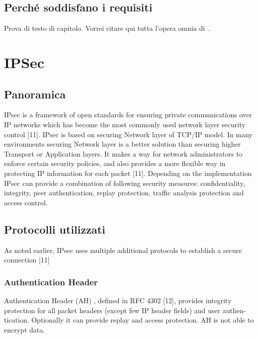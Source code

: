 \subsection{Perché soddisfano i requisiti}
Prova di testo di capitolo. Vorrei citare qui tutta l'opera omnia di~\cite{IEEE:1990,WIKI:INTEROP,BOX:1997,AHL:1996}.



\section{IPSec}
\subsection{Panoramica}
IPsec is a framework of open standards for ensuring private communications over IP networks which has become the most commonly used network layer security control [11]. IPsec is based on securing Network layer of TCP/IP model. In many environments securing Network layer is a better solution than securing higher Transport or Application layers. It makes a way for network administrators to enforce certain security policies, and also provides a more flexible way in protecting IP information for each packet [11]. Depending on the implementation IPsec can provide a combination of following security measures: confidentiality, integrity, peer authentication, replay protection, traffic analysis protection and access control.

\subsection{Protocolli utilizzati}
As noted earlier, IPsec uses multiple additional protocols to establish a secure connection [11]

\subsubsection{Authentication Header}
Authentication Header (AH) , defined in RFC 4302 [12], provides integrity protection for all packet headers (except few IP header fields) and user authen- tication. Optionally it can provide replay and access protection. AH is not able to encrypt data.

